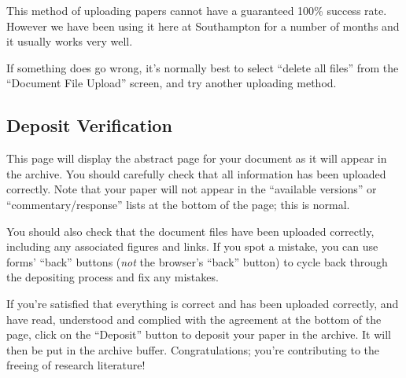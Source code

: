 This method of uploading papers cannot have a guaranteed 100\% success rate. However we have been using it here at Southampton for a number of months and it usually works very well.

If something does go wrong, it's normally best to select ``delete all files'' from the ``Document File Upload'' screen, and try another uploading method.


\subsection{Deposit Verification}

This page will display the abstract page for your document as it will appear in the archive. You should carefully check that all information has been uploaded correctly. Note that your paper will not appear in the ``available versions'' or ``commentary/response'' lists at the bottom of the page; this is normal.

You should also check that the document files have been uploaded correctly, including any associated figures and links. If you spot a mistake, you can use forms' ``back'' buttons (\emph{not} the browser's ``back'' button) to cycle back through the depositing process and fix any mistakes.

If you're satisfied that everything is correct and has been uploaded correctly, and have read, understood and complied with the agreement at the bottom of the page, click on the ``Deposit'' button to deposit your paper in the archive. It will then be put in the archive buffer. Congratulations; you're contributing to the freeing of research literature!
